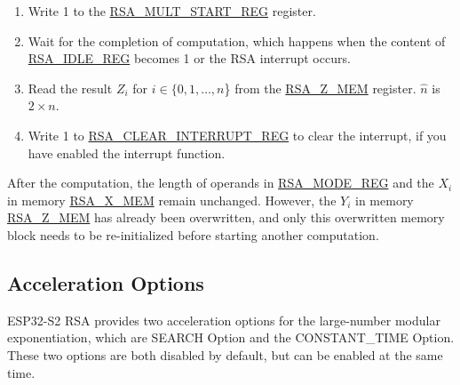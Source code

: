 \documentclass[main\_\_EN.tex]{subfiles}
\begin{document}
\begin{enumerate}
        Users need to write data to each memory block only according to the length of the number; data beyond this length are ignored.

    \item Write 1 to the \hyperref[regdesc:RSAMULTSTARTREG]{RSA\_MULT\_START\_REG} register.

    \item Wait for the completion of computation, which happens when the content of \hyperref[regdesc:RSAIDLEREG]{RSA\_IDLE\_REG} becomes 1 or the RSA interrupt occurs.

    \item Read the result \begin{math}Z_{i}\end{math}
          for \begin{math}i \in \{ 0, 1, \dots, n \end{math}\} from the \hyperref[regdesc:RSAmemory]{RSA\_Z\_MEM} register.
        \begin{math}\hat{n}\end{math} is \begin{math} 2 \times n \end{math}.

    \item Write 1 to \hyperref[regdesc:RSACLEARINTERRUPTREG]{RSA\_CLEAR\_INTERRUPT\_REG} to clear the interrupt, if you have enabled the interrupt function.

\end{enumerate}

After the computation, the length of operands in \hyperref[regdesc:RSAMODEREG]{RSA\_MODE\_REG} and the \begin{math}X_{i}\end{math} in memory \hyperref[regdesc:RSAmemory]{RSA\_X\_MEM} remain unchanged. However, the \begin{math}{Y}_{i}\end{math} in memory \hyperref[regdesc:RSAmemory]{RSA\_Z\_MEM} has already been overwritten, and only this overwritten memory block needs to be re-initialized before starting another computation.
\subsection{Acceleration Options} \label{Label Accelerate options}

ESP32-S2 RSA provides two acceleration options for the large-number modular exponentiation, which are SEARCH Option and the CONSTANT\_TIME Option. These two options are both disabled by default, but can be enabled at the same time.
\end{document}

